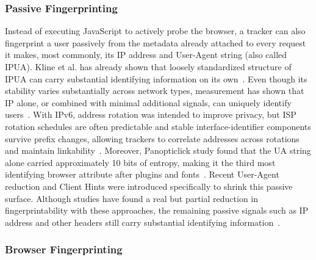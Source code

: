 \subsubsection{Passive Fingerprinting} 
\label{sec:stateless-techniques-passive-fingperinting}
%
Instead of executing JavaScript to actively probe the browser, a tracker can also fingerprint a user passively from the metadata already attached to every request it makes, most commonly, its IP address and User-Agent string (also called IPUA). 
%
Kline et al. has already shown that loosely standardized structure of IPUA can carry substantial identifying information on its own~\cite{klineStructureCharacteristicsUser2017}.
%
Even though its stability varies substantially across network types, measurement has shown that IP alone, or combined with minimal additional signals, can uniquely identify users~\cite{mishraDontCountMe2020}.
%
With IPv6, address rotation was intended to improve privacy, but ISP rotation schedules are often predictable and stable interface-identifier components survive prefix changes, allowing trackers to correlate addresses across rotations and maintain linkability~\cite{ryeFollowScentDefeating2021}.
%
Moreover, Panopticlick study found that the UA string alone carried approximately 10 bits of entropy, making it the third most identifying browser attribute after plugins and fonts~\cite{eckersleyHowUniqueYour2010}.
%
Recent User-Agent reduction and Client Hints were introduced specifically to shrink this passive surface. 
%
Although studies have found a real but partial reduction in fingerprintability with these approaches, the remaining passive signals such as IP address and other headers still carry substantial identifying information~\cite{senolUnveilingImpactUserAgent2023}.



\subsubsection{Browser Fingerprinting} 
\label{sec:stateless-techniques-browser-fingperinting}

